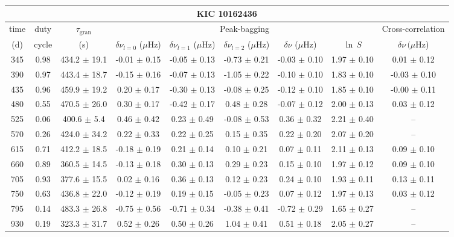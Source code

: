\documentclass[twocolumn]{aastex61}%
\begin{document}
\begin{table*}[ht]\centering\fontsize{9.}{7.}\selectfont
\begin{tabular}{ccc|ccccc|c}
\multicolumn{9}{c}{KIC 10162436}\\ \hline\hline
time & duty & $\tau_\text{gran}$ &\multicolumn{5}{c|}{Peak-bagging}&Cross-correlation\\
(d)& cycle & (s)&$\delta\nu_{l=0}$ ($\mu$Hz) & $\delta\nu_{l=1}$ ($\mu$Hz) & $\delta\nu_{l=2}$ ($\mu$Hz) & $\delta\nu$ ($\mu$Hz)& $\ln\,S$ & $\delta\nu\,(\mu$Hz)\\\hline
345 & 0.98 & 434.2 $\pm$ 19.1 & -0.01 $\pm$ 0.15 & -0.05 $\pm$ 0.13 & -0.73 $\pm$ 0.21 & -0.03 $\pm$ 0.10 & 1.97 $\pm$ 0.10 & 0.01 $\pm$ 0.12\\
390 & 0.97 & 443.4 $\pm$ 18.7 & -0.15 $\pm$ 0.16 & -0.07 $\pm$ 0.13 & -1.05 $\pm$ 0.22 & -0.10 $\pm$ 0.10 & 1.83 $\pm$ 0.10 & -0.03 $\pm$ 0.10\\
435 & 0.96 & 459.9 $\pm$ 19.2 & 0.20 $\pm$ 0.17 & -0.30 $\pm$ 0.13 & -0.08 $\pm$ 0.25 & -0.12 $\pm$ 0.10 & 1.85 $\pm$ 0.10 & -0.00 $\pm$ 0.11\\
480 & 0.55 & 470.5 $\pm$ 26.0 & 0.30 $\pm$ 0.17 & -0.42 $\pm$ 0.17 & 0.48 $\pm$ 0.28 & -0.07 $\pm$ 0.12 & 2.00 $\pm$ 0.13 & 0.03 $\pm$ 0.12\\
525 & 0.06 & 400.6 $\pm$ 5.4 & 0.46 $\pm$ 0.42 & 0.23 $\pm$ 0.49 & -0.08 $\pm$ 0.53 & 0.36 $\pm$ 0.32 & 2.21 $\pm$ 0.40 & --\\
570 & 0.26 & 424.0 $\pm$ 34.2 & 0.22 $\pm$ 0.33 & 0.22 $\pm$ 0.25 & 0.15 $\pm$ 0.35 & 0.22 $\pm$ 0.20 & 2.07 $\pm$ 0.20 & --\\
615 & 0.71 & 412.2 $\pm$ 18.5 & -0.18 $\pm$ 0.19 & 0.21 $\pm$ 0.14 & 0.10 $\pm$ 0.21 & 0.07 $\pm$ 0.11 & 2.11 $\pm$ 0.13 & 0.09 $\pm$ 0.10\\
660 & 0.89 & 360.5 $\pm$ 14.5 & -0.13 $\pm$ 0.18 & 0.30 $\pm$ 0.13 & 0.29 $\pm$ 0.23 & 0.15 $\pm$ 0.10 & 1.97 $\pm$ 0.12 & 0.09 $\pm$ 0.10\\
705 & 0.93 & 377.6 $\pm$ 15.5 & 0.02 $\pm$ 0.16 & 0.36 $\pm$ 0.13 & 0.12 $\pm$ 0.23 & 0.24 $\pm$ 0.10 & 1.93 $\pm$ 0.11 & 0.13 $\pm$ 0.11\\
750 & 0.63 & 436.8 $\pm$ 22.0 & -0.12 $\pm$ 0.19 & 0.19 $\pm$ 0.15 & -0.05 $\pm$ 0.23 & 0.07 $\pm$ 0.12 & 1.97 $\pm$ 0.13 & 0.03 $\pm$ 0.12\\
795 & 0.14 & 483.3 $\pm$ 26.8 & -0.75 $\pm$ 0.56 & -0.71 $\pm$ 0.34 & -0.38 $\pm$ 0.41 & -0.72 $\pm$ 0.29 & 1.65 $\pm$ 0.27 & --\\
930 & 0.19 & 323.3 $\pm$ 31.7 & 0.52 $\pm$ 0.26 & 0.50 $\pm$ 0.26 & 1.04 $\pm$ 0.41 & 0.51 $\pm$ 0.18 & 2.05 $\pm$ 0.27 & --\\

\end{tabular}
\end{table*}
\end{document}
